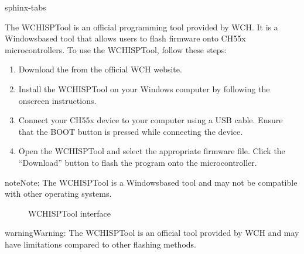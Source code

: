 \documentclass[letterpaper,10pt,english]{sphinxmanual}
\begin{document}
\begin{sphinxuseclass}{sphinx-tabs}
\sphinxAtStartPar
{}

\sphinxAtStartPar
The WCHISPTool is an official programming tool provided by WCH. It is a Windows\sphinxhyphen{}based tool that allows users to flash firmware onto CH55x microcontrollers.
To use the WCHISPTool, follow these steps:
\begin{enumerate}
%
\item {} 
\sphinxAtStartPar
{}

\sphinxAtStartPar
Download the  from the official WCH website.

\item {} 
\sphinxAtStartPar
{}

\sphinxAtStartPar
Install the WCHISPTool on your Windows computer by following the on\sphinxhyphen{}screen instructions.

\item {} 
\sphinxAtStartPar
{}

\sphinxAtStartPar
Connect your CH55x device to your computer using a USB cable. Ensure that the BOOT button is pressed while connecting the device.

\item {} 
\sphinxAtStartPar
{}

\sphinxAtStartPar
Open the WCHISPTool and select the appropriate firmware file. Click the “Download” button to flash the program onto the microcontroller.

\end{enumerate}

\begin{sphinxadmonition}{note}{Note:}
\sphinxAtStartPar
The WCHISPTool is a Windows\sphinxhyphen{}based tool and may not be compatible with other operating systems.
\end{sphinxadmonition}

\begin{figure}[htbp]
\centering
\capstart

\noindent{}
\caption{WCHISPTool interface}\label{\detokenize{compile:id19}}\label{\detokenize{compile:id6}}\end{figure}

\begin{sphinxadmonition}{warning}{Warning:}
\sphinxAtStartPar
The WCHISPTool is an official tool provided by WCH and may have limitations compared to other flashing methods.
\end{sphinxadmonition}


\end{sphinxuseclass}
\end{document}
